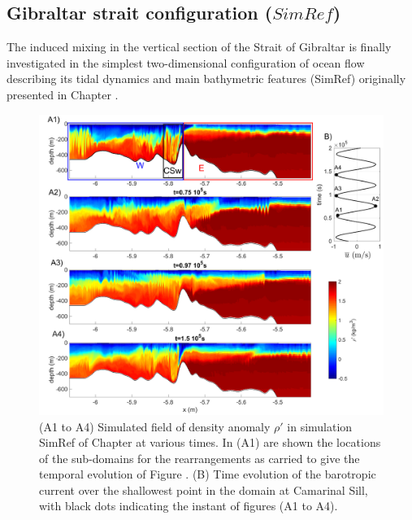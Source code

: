 \subsection{Gibraltar strait configuration ($SimRef$)}
The induced mixing in the vertical section of the Strait of Gibraltar is finally investigated in the simplest two-dimensional configuration of ocean flow describing its tidal dynamics and main bathymetric features (SimRef) originally presented in Chapter .
\begin{figure}[h!]
\centering
\includegraphics[width=1\textwidth]{./CHAP_BPE/Fig_Kappa_CS_ex.png}
\caption[Field of density anomaly in SimRef and definition of sub-domains.]{(A1 to A4) Simulated field of density anomaly $\rho'$ in simulation SimRef of Chapter  at various times. In (A1) are shown the locations of the sub-domains for the rearrangements as carried to give the temporal evolution of Figure . (B) Time evolution of the barotropic current over the shallowest point in the domain at Camarinal Sill, with black dots indicating the instant of figures (A1 to A4).}
\label{figCgbr2d_ex}
\end{figure}
